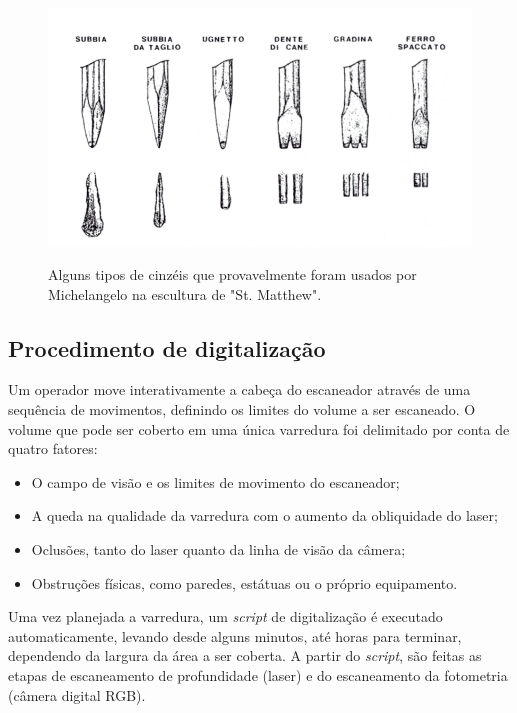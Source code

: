 
\begin{figure}
	\centering
	\caption{%
		Alguns tipos de cinzéis que provavelmente foram usados por Michelangelo na escultura de "St. Matthew".
	}
	\includegraphics[width=0.5\linewidth]{figs/ferramentasMich.png}
	\label{fig:cinzeis}
\end{figure}

\subsection{Procedimento de digitalização}

Um operador move interativamente a cabeça do escaneador através de uma
sequência de movimentos, definindo os limites do volume a ser escaneado. O
volume que pode ser coberto em uma única varredura foi delimitado por conta de
quatro fatores:
\begin{itemize}
\item{O campo de visão e os limites de movimento do escaneador;}
\item{A  queda na qualidade da varredura com o aumento da obliquidade do laser;}
\item{Oclusões, tanto do laser quanto da linha de visão da câmera;}
\item{Obstruções físicas, como paredes, estátuas ou o próprio equipamento.}
\end{itemize}

Uma vez planejada a varredura, um \emph{script} de digitalização é executado
automaticamente, levando desde alguns minutos, até horas para terminar,
dependendo da largura da área a ser coberta.  A partir do \emph{script}, são feitas as
etapas de escaneamento de profundidade (laser) e do escaneamento da fotometria
(câmera digital RGB).

